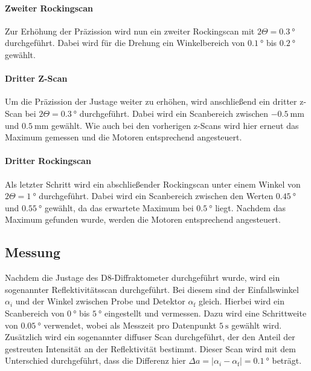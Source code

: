 \paragraph{Zweiter Rockingscan}
Zur Erhöhung der Präzission wird nun ein zweiter Rockingscan mit $2\Theta = \SI{0.3}{\degree}$ durchgeführt. Dabei wird für die Drehung ein Winkelbereich
von $\SI{0.1}{\degree}$ bis $\SI{0.2}{\degree}$ gewählt.


\paragraph{Dritter Z-Scan}
Um die Präzission der Justage weiter zu erhöhen, wird anschließend ein dritter z-Scan bei $2\Theta = \SI{0.3}{\degree}$ durchgeführt. Dabei wird ein Scanbereich zwischen $\SI{-0.5}{\milli\meter}$ und $ \SI{0.5}{\milli\meter}$ gewählt. Wie auch bei den vorherigen z-Scans wird hier erneut das Maximum gemessen und die Motoren entsprechend angesteuert.

\paragraph{Dritter Rockingscan}
Als letzter Schritt wird ein abschließender Rockingscan unter einem Winkel von $2\Theta = \SI{1}{\degree}$ durchgeführt. 
Dabei wird ein Scanbereich zwischen den Werten $\SI{0.45}{\degree}$ und $\SI{0.55}{\degree}$ gewählt, da das erwartete Maximum bei $\SI{0.5}{\degree}$ liegt.
Nachdem das Maximum gefunden wurde, werden die Motoren entsprechend angesteuert. 



\subsection{Messung}
\label{subsec:messung}
Nachdem die Justage des D8-Diffraktometer durchgeführt wurde, wird ein sogenannter Reflektivitätsscan durchgeführt. Bei diesem sind der Einfallswinkel $\alpha_i$ und der Winkel zwischen Probe und Detektor $\alpha_{\text{f}}$ gleich. Hierbei wird ein Scanbereich von $\SI{0}{\degree}$ bis
$\SI{5}{\degree}$ eingestellt und vermessen. Dazu wird eine Schrittweite von $\SI{0.05}{\degree}$ verwendet, wobei als Messzeit pro Datenpunkt $\SI{5}{\second}$ gewählt wird. \\
Zusätzlich wird ein sogenannter diffuser Scan durchgeführt, der den Anteil der gestreuten Intensität an der Reflektivität bestimmt. Dieser Scan wird mit dem Unterschied durchgeführt, dass die Differenz hier $\Delta a = | \alpha_i - \alpha_{\text{f}} | =  \SI{0,1}{\degree} $ beträgt.
